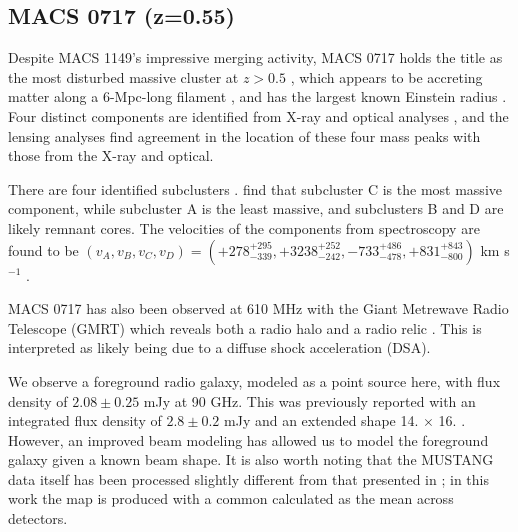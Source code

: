 \documentclass[iop,numberedappendix,apj]{emulateapj}
\begin{document}

\subsection{MACS 0717 (z=0.55)}
\label{sec:results_m0717}



Despite MACS 1149's impressive merging activity, MACS 0717 holds the title as the most disturbed massive cluster at $z> 0.5$
\citep{ebeling2007}, which appears to be accreting matter along a 6-Mpc-long filament \citep{ebeling2004}, and has the
largest known Einstein radius \citep[$\theta_e \sim 55$\asec;][]{zitrin2009}. Four distinct components are identified
from X-ray and optical analyses \citep{ma2009}, and the lensing analyses \citep{zitrin2009,limousin2012} find agreement
in the location of these four mass peaks with those from the X-ray and optical. 

There are four identified subclusters \citep[labeled A through D][]{mroczkowski2012}. \citet{ma2009} find that subcluster C is the
most massive component, while subcluster A is the least massive, and subclusters B and D are likely remnant cores. The
velocities of the components from spectroscopy are found to be $(v_A, v_B, v_C, v_D) = (+278_{-339}^{+295},+3238_{-242}^{+252},
-733_{-478}^{+486},+831_{-800}^{+843})$ km s$^{-1}$ \citep{ma2009}. 

MACS 0717 has also been observed at 610 MHz with the Giant Metrewave Radio Telescope (GMRT) which reveals both a radio
halo and a radio relic \citep{vanweeren2009}. This is interpreted as likely being due to a diffuse shock acceleration
(DSA).

We observe a foreground radio galaxy, modeled as a point source here, with flux density of $2.08 \pm 0.25$ mJy at 90 GHz. 
This was previously reported with an integrated flux density of $2.8 \pm 0.2$ mJy and an extended shape 14. $\times$ 16. 
\citep{mroczkowski2012}. However, an improved beam modeling has allowed us to model the foreground galaxy given a known beam shape. 
It is also worth
noting that the MUSTANG data itself has been processed slightly different from that presented in \citet{mroczkowski2012};
in this work the map is produced with a common calculated as the mean across detectors.
\end{document}
